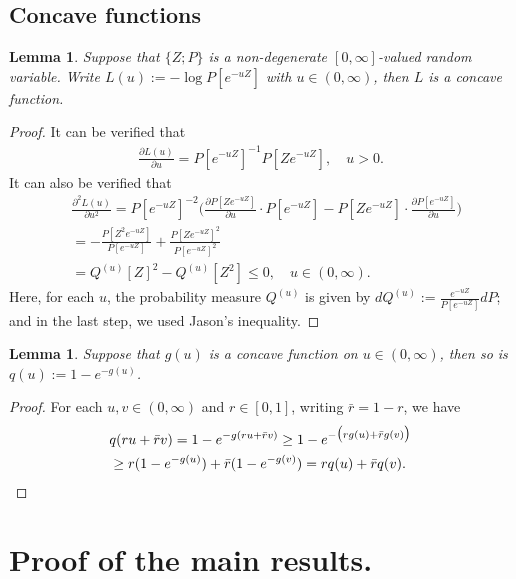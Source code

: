 \documentclass[12pt,a4paper]{amsart}
\numberwithin{equation}{section}
\theoremstyle{plain}
\newtheorem{lem}[thm]{Lemma}
\theoremstyle{definition}
\begin{document}
\subsection{Concave functions}
\begin{lem}
  \label{lem:C}
  Suppose that $\{Z; P\}$ is a non-degenerate $[0,\infty]$-valued random variable. 
  Write $L(u):= - \log P[e^{- u Z}]$ with $u \in (0,\infty)$, then $L$ is a concave function.
\end{lem} 
\begin{proof}
	It can be verified that
  \begin{align}
    \frac{\partial L(u)}{\partial u} = P[e^{-u Z}]^{-1} P[Ze^{- u Z}]
    , \quad u > 0.
  \end{align}
  It can also be verified that
  \begin{align}
    & \frac{\partial^2 L(u)}{\partial u^2}
    = P[e^{-uZ}]^{-2}\Big( \frac{\partial P[Ze^{-uZ}]}{\partial u} \cdot P[e^{-uZ}] - P[Ze^{-uZ}] \cdot \frac{\partial P[e^{-uZ}]}{\partial u}\Big) \\
    & = - \frac{P[Z^2 e^{-uZ}]}{P[e^{-uZ}]} + \frac{P[Ze^{-uZ}]^2}{P[e^{-uZ}]^2} \\
    & = Q^{(u)}[Z]^2 - Q^{(u)}[Z^2] 
      \leq 0
      , \quad u \in (0,\infty).
  \end{align}
  Here, for each $u$, the probability measure $Q^{(u)}$ is given by $dQ^{(u)}:= \frac{e^{-uZ}}{P[e^{-uZ}]} dP$; and in the last step, we used Jason's inequality.
\end{proof}
\begin{lem}
	\label{lem:Q}
  Suppose that $g(u)$ is a concave function on $u\in (0,\infty)$, then so is $q(u):= 1- e^{-g(u)}$.
\end{lem}
\begin{proof}
For each $u,v \in (0,\infty)$ and $r \in [0,1]$, writing $\bar r = 1-r$, we have
\begin{align}
	&q(ru+\bar r v) 
  = 1 - e^{- g(ru + \bar r v)}
  \geq 1 - e^{- \big( r g(u) + \bar r g(v)\big)} \\
  & \geq r(1- e^{- g(u)}) + \bar r (1 - e^{- g(v)})
    = rq(u) + \bar r q(v).
    \qedhere
\end{align}	
\end{proof}
\section{Proof of the main results.}
\end{document}
